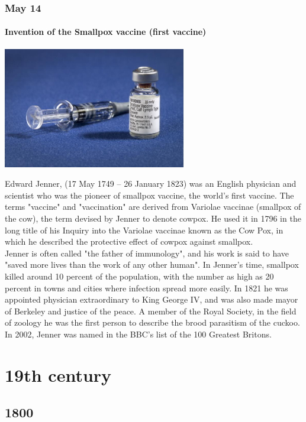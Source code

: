\documentclass[11pt]{report}
\begin{document}
\section{May 14}
\subsection{Invention of the Smallpox vaccine (first vaccine)}
\vspace{2mm}\begin{center}\includegraphics[width=8cm]{./img/smallpoxVaccine.jpg}\end{center}
Edward Jenner, (17 May 1749 – 26 January 1823) was an English physician and scientist who was the pioneer of smallpox vaccine, the world's first vaccine. The terms "vaccine" and "vaccination" are derived from Variolae vaccinae (smallpox of the cow), the term devised by Jenner to denote cowpox. He used it in 1796 in the long title of his Inquiry into the Variolae vaccinae known as the Cow Pox, in which he described the protective effect of cowpox against smallpox.\\
\indent Jenner is often called "the father of immunology", and his work is said to have "saved more lives than the work of any other human". In Jenner’s time, smallpox killed around 10 percent of the population, with the number as high as 20 percent in towns and cities where infection spread more easily. In 1821 he was appointed physician extraordinary to King George IV, and was also made mayor of Berkeley and justice of the peace. A member of the Royal Society, in the field of zoology he was the first person to describe the brood parasitism of the cuckoo. In 2002, Jenner was named in the BBC's list of the 100 Greatest Britons.

						
\part{19th century}
\chapter{1800}
\end{document}

